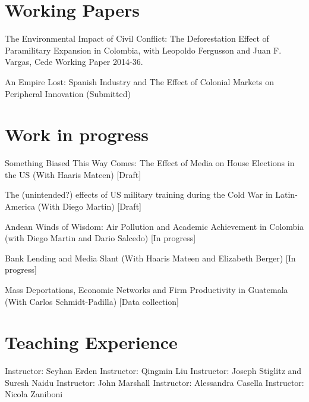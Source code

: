 \documentclass{moderncv}
\begin{document}
\section{\textbf{Working Papers}}
{The Environmental Impact of Civil Conflict: The Deforestation Effect of Paramilitary Expansion in Colombia, with Leopoldo Fergusson and Juan F. Vargas, Cede Working Paper 2014-36.\\}

{An Empire Lost: Spanish Industry and The Effect of Colonial Markets on Peripheral  Innovation (Submitted)}

\section{\textbf{Work in progress}}

{Something Biased This Way Comes: The Effect of Media on House Elections in the US (With Haaris Mateen) [Draft] \\ }

{The (unintended?) effects of US military training during the Cold War in Latin-America (With Diego Martin) [Draft]\\ }

{Andean Winds of Wisdom: Air Pollution and Academic Achievement in Colombia (with Diego Martin and Dario Salcedo) [In progress]\\ }

{Bank Lending and Media Slant (With Haaris Mateen and Elizabeth Berger)  [In progress] \\ }

{Mass Deportations, Economic Networks and Firm Productivity in Guatemala (With Carlos Schmidt-Padilla)  [Data collection] \\ }

\section{\textbf{Teaching Experience}}
 {}{}{Instructor: Seyhan Erden}
 {}{}{Instructor: Qingmin Liu}
 {}{}{Instructor: Joseph Stiglitz and Suresh Naidu}
 {}{}{Instructor: John Marshall}
 {}{}{Instructor: Alessandra Casella}
 {}{}{Instructor: Nicola Zaniboni}
\end{document}
